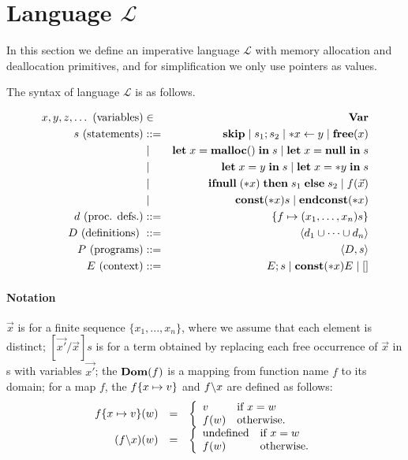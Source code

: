 \section{Language \(\mathcal{L}\)}\label{sec:language}
In this section we define an imperative language \(\mathcal{L}\) with
memory allocation and deallocation primitives, and for simplification
we only use pointers as values.

The syntax of language \(\mathcal{L}\) is as follows.

\begin{eqnarray*}
  x,y,z,\dots \mbox{ (variables)} &\in& \mathbf{Var}\\
  s \mbox{ (statements)} & ::= &  \mathbf{skip} \mid s_{1};s_{2} \mid *x \leftarrow y \mid \mathbf{free}(x) \\
  & \mid & \mathbf{let}\; x = \mathbf{malloc()}\; \mathbf{in}\; s \mid \mathbf{let}\; x = \mathbf{null}\ \mathbf{in}\; s  \\
  & \mid & \mathbf{let}\; x = y \; \mathbf{in}\; s \mid   \mathbf{let}\; x = *y \; \mathbf{in}\; s \\
  & \mid & \mathbf{ifnull}\;(*x) \; \mathbf{then}\; s_{1}\; \mathbf{else}\; s_{2} \mid f(\vec{x})\\
  & \mid & \mathbf{const}(*x) s \mid \mathbf{endconst}(*x)  \\
  d \mbox{ (proc. defs.)} & ::= & \{f \mapsto (x_1,\dots,x_n)s\}\\
  D \mbox{ (definitions) } &::=& \langle d_1 \cup \dots \cup d_n \rangle\\
  P \mbox{ (programs)} &::=& \langle D, s \rangle\\
  E \mbox{ (context)} &::=& E;s \mid \mathbf{const}(*x) E \mid [ ] 
\end{eqnarray*}

\paragraph{Notation} \(\vec{x}\) is for a finite sequence \(\{x_1,...,x_n\}\),
where we assume that each element is distinct; \([\vec{x'}/\vec{x}]s\)
is for a term obtained by replacing each free occurrence of
\(\vec{x}\) in s with variables \(\vec{x'}\); the \(\mathbf{Dom}(f)\) is a
mapping from function name \(f\) to its domain; for a map \(f\), the
\(f \{x \mapsto v\}\) and \( f \backslash x\) are defined as follows:
\[
\begin{array}{rcl}
f \{x \mapsto v\} (w) &=&
\left\{
\begin{array}{ll}
v & \mbox{if \(x = w\)}\\
f(w) & \mbox{otherwise.}
\end{array}
\right.\\
(f \backslash x)(w) &=&
\left\{
\begin{array}{ll}
\mbox{undefined} & \mbox{if \(x = w\)}\\
f(w) & \mbox{otherwise.}
\end{array}
\right.
\end{array}
\]

